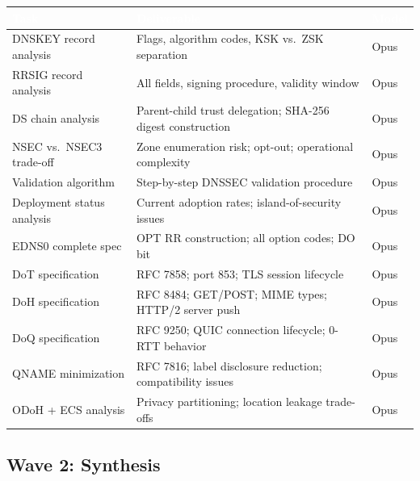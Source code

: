 \documentclass[11pt,letterpaper]{article}
\newcommand{\tableheader}[1]{\textbf{\sffamily\textcolor{white}{#1}}}
\begin{document}
\begin{center}
\begin{tabularx}{\textwidth}{L{4cm}XC{1.8cm}}
\toprule
{}
\tableheader{Task} & \tableheader{Deliverable} & \tableheader{Model} \\
\midrule
DNSKEY record analysis & Flags, algorithm codes, KSK vs.\ ZSK separation & Opus \\
RRSIG record analysis & All fields, signing procedure, validity window & Opus \\
DS chain analysis & Parent-child trust delegation; SHA-256 digest construction & Opus \\
NSEC vs.\ NSEC3 trade-off & Zone enumeration risk; opt-out; operational complexity & Opus \\
Validation algorithm & Step-by-step DNSSEC validation procedure & Opus \\
Deployment status analysis & Current adoption rates; island-of-security issues & Opus \\
EDNS0 complete spec & OPT RR construction; all option codes; DO bit & Opus \\
DoT specification & RFC 7858; port 853; TLS session lifecycle & Opus \\
DoH specification & RFC 8484; GET/POST; MIME types; HTTP/2 server push & Opus \\
DoQ specification & RFC 9250; QUIC connection lifecycle; 0-RTT behavior & Opus \\
QNAME minimization & RFC 7816; label disclosure reduction; compatibility issues & Opus \\
ODoH + ECS analysis & Privacy partitioning; location leakage trade-offs & Opus \\
\bottomrule
\end{tabularx}
\end{center}

\subsection{Wave 2: Synthesis}
\end{document}
